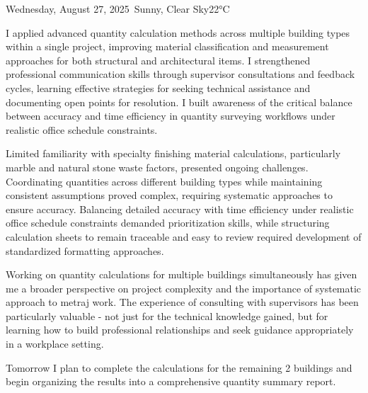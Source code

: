 \begin{dailyentry}{Wednesday, August 27, 2025}{\weathersunny\ Sunny, Clear Sky}{22°C}
\begin{skillslearned}
\item[] I applied advanced quantity calculation methods across multiple building types within a single project, improving material classification and measurement approaches for both structural and architectural items. I strengthened professional communication skills through supervisor consultations and feedback cycles, learning effective strategies for seeking technical assistance and documenting open points for resolution. I built awareness of the critical balance between accuracy and time efficiency in quantity surveying workflows under realistic office schedule constraints.
\end{skillslearned}

\begin{challenges}
\item[] Limited familiarity with specialty finishing material calculations, particularly marble and natural stone waste factors, presented ongoing challenges. Coordinating quantities across different building types while maintaining consistent assumptions proved complex, requiring systematic approaches to ensure accuracy. Balancing detailed accuracy with time efficiency under realistic office schedule constraints demanded prioritization skills, while structuring calculation sheets to remain traceable and easy to review required development of standardized formatting approaches.
\end{challenges}

\begin{dailynotes}
Working on quantity calculations for multiple buildings simultaneously has given me a broader perspective on project complexity and the importance of systematic approach to metraj work. The experience of consulting with supervisors has been particularly valuable - not just for the technical knowledge gained, but for learning how to build professional relationships and seek guidance appropriately in a workplace setting.

Tomorrow I plan to complete the calculations for the remaining 2 buildings and begin organizing the results into a comprehensive quantity summary report.
\end{dailynotes}

\begin{approvalsection}
\end{approvalsection}

\end{dailyentry}
